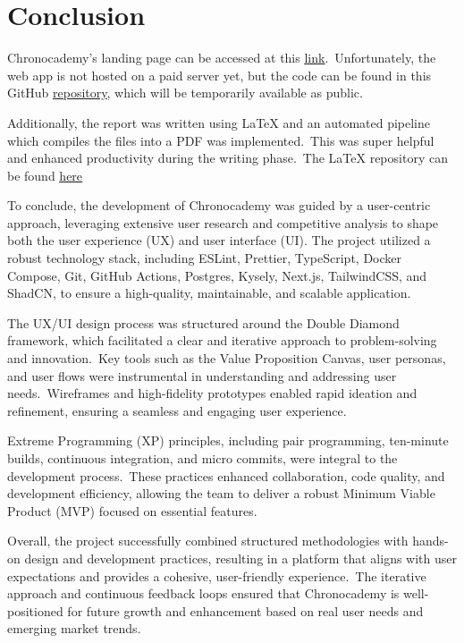 \chapter{Conclusion}\label{ch:conclusion}

Chronocademy's landing page can be accessed at this \href{https://chronocademy.com}{\underline{link}}.\ Unfortunately, the web app is not hosted on a paid server yet, but the code can be found in this GitHub \href{https://github.com/juaninicolai/chronocademy}{\underline{repository}}, which will be temporarily available as public.

Additionally, the report was written using LaTeX and an automated pipeline which compiles the files into a PDF was implemented.\ This was super helpful and enhanced productivity during the writing phase.\ The LaTeX repository can be found \href{https://github.com/veselyn/cba-final-report}{\underline{here}}

To conclude, the development of Chronocademy was guided by a user-centric approach, leveraging extensive user research and competitive analysis to shape both the user experience (UX) and user interface (UI). The project utilized a robust technology stack, including ESLint, Prettier, TypeScript, Docker Compose, Git, GitHub Actions, Postgres, Kysely, Next.js, TailwindCSS, and ShadCN, to ensure a high-quality, maintainable, and scalable application.

The UX/UI design process was structured around the Double Diamond framework, which facilitated a clear and iterative approach to problem-solving and innovation.\ Key tools such as the Value Proposition Canvas, user personas, and user flows were instrumental in understanding and addressing user needs.\ Wireframes and high-fidelity prototypes enabled rapid ideation and refinement, ensuring a seamless and engaging user experience.

Extreme Programming (XP) principles, including pair programming, ten-minute builds, continuous integration, and micro commits, were integral to the development process.\ These practices enhanced collaboration, code quality, and development efficiency, allowing the team to deliver a robust Minimum Viable Product (MVP) focused on essential features.

Overall, the project successfully combined structured methodologies with hands-on design and development practices, resulting in a platform that aligns with user expectations and provides a cohesive, user-friendly experience.\ The iterative approach and continuous feedback loops ensured that Chronocademy is well-positioned for future growth and enhancement based on real user needs and emerging market trends.